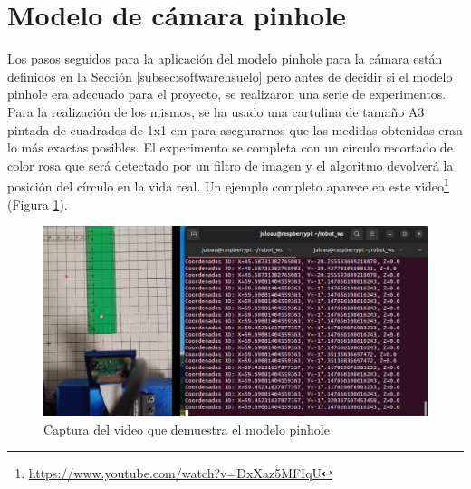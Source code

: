 \section{Modelo de cámara pinhole}
\label{sec:expmodelopinhole}

Los pasos seguidos para la aplicación del modelo pinhole para la cámara están definidos en la Sección \ref{subsec:softwarehsuelo} pero antes de decidir si el modelo pinhole era adecuado para el proyecto, se realizaron una serie de experimentos. Para la realización de los mismos, se ha usado una cartulina de tamaño A3 pintada de cuadrados de 1x1 cm para asegurarnos que las medidas obtenidas eran lo más exactas posibles. El experimento se completa con un círculo recortado de color rosa que será detectado por un filtro de imagen y el algoritmo devolverá la posición del círculo en la vida real. Un ejemplo completo aparece en este video\footnote{\url{https://www.youtube.com/watch?v=DxXaz5MFIqU}} (Figura \ref{fig:exppinhole}).



\begin{figure} [h!]
	\begin{center}
			\includegraphics[width=15cm]{figs/cap7/exppinhole.png}
		\end{center}
	\caption{Captura del video que demuestra el modelo pinhole}
	\label{fig:exppinhole}
\end{figure}


